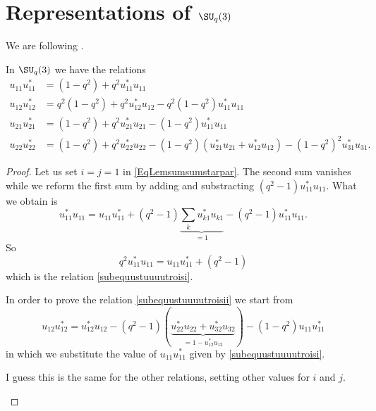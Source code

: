 \section{Representations of $\SU_q(3)$}

We are following \cite{Bragiel}.

\begin{lemma}       \label{Lemxijxstijsuqt}
	In \( \SU_q(3)\) we have the relations
	\begin{subequations}
		\begin{align}
			u_{11}u^*_{11} & =(1-q^2)+q^2u_{11}^*u_{11}       \label{subequustuuuutroisi}                               \\
			u_{12}u_{12}^* & =q^2(1-q^2)+q^2u_{12}^*u_{12}-q^2(1-q^2)u_{11}^*u_{11}   \label{subequustuuuutroisii}      \\
			u_{21}u_{21}^* & =(1-q^2)+q^2u_{21}^*u_{21}-(1-q^2)u_{11}^*u_{11}                                           \\
			u_{22}u_{22}^* & =(1-q^2)+q^2u_{22}^*u_{22}-(1-q^2)(u_{21}^*u_{21}+u_{12}^*u_{12})-(1-q^2)^2u_{31}^*u_{31}.
		\end{align}
	\end{subequations}
\end{lemma}

\begin{proof}
	Let us set \( i=j=1\) in \eqref{EqLemsumsumstarpar}. The second sum vanishes while we reform the first sum by adding and substracting \( (q^2-1)u_{11}^*u_{11}\). What we obtain is
	\begin{equation}
		u_{11}^*u_{11}=u_{11}u_{11}^*+(q^2-1)\underbrace{\sum_ku_{k1}^*u_{k1}}_{=1}-(q^2-1)u_{11}^*u_{11}.
	\end{equation}
	So
	\begin{equation}
		q^2u_{11}^*u_{11}=u_{11}u_{11}^*+(q^2-1)
	\end{equation}
	which is the relation \eqref{subequustuuuutroisi}.

	In order to prove the relation \eqref{subequustuuuutroisii} we start from
	\begin{equation}
		u_{12}u_{12}^*=u_{12}^*u_{12}-(q^2-1)(\underbrace{u_{22}^*u_{22}+u_{32}^*u_{32}}_{=1-u_{12}^*u_{12}})-(1-q^2)u_{11}u_{11}^*
	\end{equation}
	in which we substitute the value of \( u_{11}u_{11}^*\) given by \eqref{subequustuuuutroisi}.

	\begin{probleme}
		I guess this is the same for the other relations, setting other values for \( i\) and \( j\).
	\end{probleme}
\end{proof}

